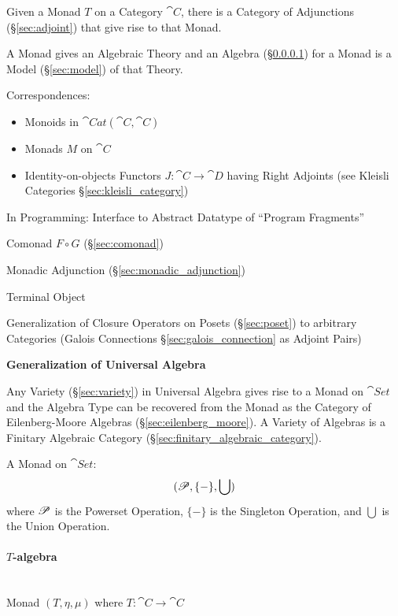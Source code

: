 Given a Monad $T$ on a Category $\cat{C}$, there is a Category of
Adjunctions (\S\ref{sec:adjoint}) that give rise to that Monad.

A Monad gives an Algebraic Theory and an Algebra
(\S\ref{sec:t_algebra}) for a Monad is a Model (\S\ref{sec:model}) of
that Theory. %

Correspondences: \cite{jacobs-heunen-hasuo09}
\begin{itemize}
\item Monoids in $\cat{Cat}(\cat{C},\cat{C})$
\item Monads $M$ on $\cat{C}$
\item Identity-on-objects Functors $J : \cat{C} \rightarrow \cat{D}$
  having Right Adjoints (see Kleisli Categories
  \S\ref{sec:kleisli_category})
\end{itemize}

In Programming: Interface to Abstract Datatype of ``Program
Fragments''



Comonad $F \circ G$ (\S\ref{sec:comonad})

Monadic Adjunction (\S\ref{sec:monadic_adjunction})

Terminal Object %

Generalization of Closure Operators on Posets (\S\ref{sec:poset}) to
arbitrary Categories (Galois Connections \S\ref{sec:galois_connection}
as Adjoint Pairs)



\textbf{Generalization of Universal Algebra}

Any Variety (\S\ref{sec:variety}) in Universal Algebra gives rise to a
Monad on $\cat{Set}$ and the Algebra Type can be recovered from the
Monad as the Category of Eilenberg-Moore Algebras
(\S\ref{sec:eilenberg_moore}). A Variety of Algebras is a Finitary
Algebraic Category (\S\ref{sec:finitary_algebraic_category}).

A Monad on $\cat{Set}$:
\[
  (\mathscr{P}, \{-\}, \bigcup)
\]
where $\mathscr{P}$ is the Powerset Operation, $\{-\}$ is the
Singleton Operation, and $\bigcup$ is the Union Operation.



\paragraph{$T$-algebra}\label{sec:t_algebra}
\hfill \\

Monad $(T, \eta, \mu)$ where $T : \cat{C} \rightarrow \cat{C}$

